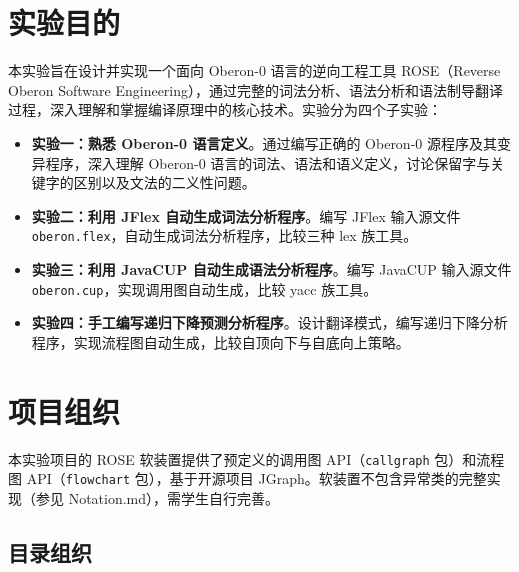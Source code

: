 \chapter*{实验目的}

本实验旨在设计并实现一个面向 Oberon-0 语言的逆向工程工具 ROSE（Reverse Oberon Software Engineering），通过完整的词法分析、语法分析和语法制导翻译过程，深入理解和掌握编译原理中的核心技术。实验分为四个子实验：

\begin{itemize}
  \item \textbf{实验一：熟悉 Oberon-0 语言定义}。通过编写正确的 Oberon-0 源程序及其变异程序，深入理解 Oberon-0 语言的词法、语法和语义定义，讨论保留字与关键字的区别以及文法的二义性问题。
  \item \textbf{实验二：利用 JFlex 自动生成词法分析程序}。编写 JFlex 输入源文件 \texttt{oberon.flex}，自动生成词法分析程序，比较三种 lex 族工具。
  \item \textbf{实验三：利用 JavaCUP 自动生成语法分析程序}。编写 JavaCUP 输入源文件 \texttt{oberon.cup}，实现调用图自动生成，比较 yacc 族工具。
  \item \textbf{实验四：手工编写递归下降预测分析程序}。设计翻译模式，编写递归下降分析程序，实现流程图自动生成，比较自顶向下与自底向上策略。
\end{itemize}


\chapter*{项目组织}

本实验项目的 ROSE 软装置提供了预定义的调用图 API（\texttt{callgraph} 包）和流程图 API（\texttt{flowchart} 包），基于开源项目 JGraph。软装置不包含异常类的完整实现（参见 Notation.md），需学生自行完善。

\section*{目录组织}

